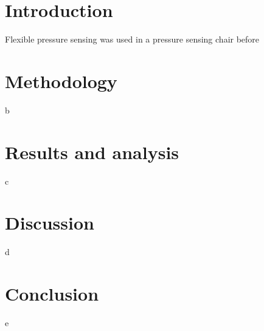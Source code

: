 \documentclass[
	ngerman,
	ruledheaders=section,%
	class=report,%
	thesis={type=bachelor},%
	accentcolor=9c,%
	custommargins=true,%
	marginpar=false,%
	parskip=half-,%
	fontsize=11pt,%
]{tudapub}
\begin{document}
\tableofcontents

\chapter{Introduction}
Flexible pressure sensing was used in a pressure sensing chair before\cite{tudapub}

\chapter{Methodology}
b

\chapter{Results and analysis}
c

\chapter{Discussion}
d

\chapter{Conclusion}
e


\printbibliography
\end{document}
